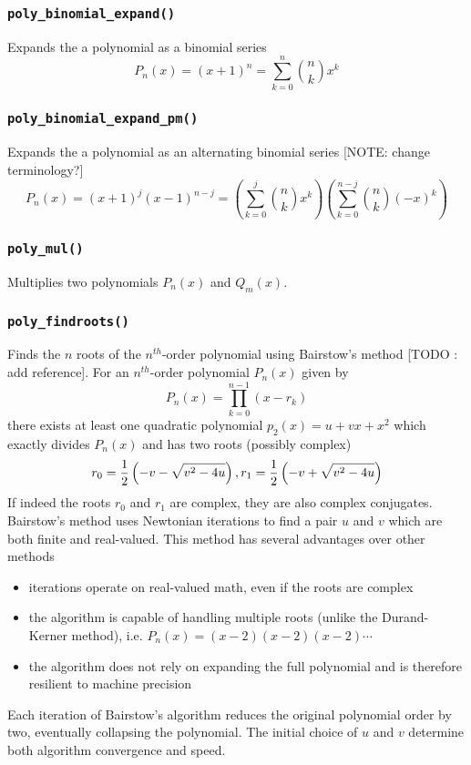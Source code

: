 \subsubsection{{\tt poly\_binomial\_expand()}}
Expands the a polynomial as a binomial series
\[
    P_n(x) = (x+1)^n = \sum_{k=0}^{n}{ {n \choose k} x^k}
\]

\subsubsection{{\tt poly\_binomial\_expand\_pm()}}
Expands the a polynomial as an alternating binomial series
[NOTE: change terminology?]
\[
    P_n(x) = (x+1)^j (x-1)^{n-j}
           = \left( \sum_{k=0}^{j}  { {n \choose k}    x^k} \right)
             \left( \sum_{k=0}^{n-j}{ {n \choose k} (-x)^k} \right)
\]

\subsubsection{{\tt poly\_mul()}}
Multiplies two polynomials $P_n(x)$ and $Q_m(x)$.


\subsubsection{{\tt poly\_findroots()}}
Finds the $n$ roots of the $n^{th}$-order polynomial using Bairstow's method
[TODO : add reference].
For an $n^{th}$-order polynomial $P_n(x)$ given by
\[
    P_n(x) = \prod_{k=0}^{n-1}{(x-r_k)}
\]
there exists at least one quadratic polynomial $p_{2}(x)=u + vx + x^2$ which
exactly divides $P_{n}(x)$ and has two roots (possibly complex)
\[
    r_0 = \frac{1}{2}\left(-v-\sqrt{v^2-4u}\right), \; \\
    r_1 = \frac{1}{2}\left(-v+\sqrt{v^2-4u}\right)
\]
If indeed the roots $r_0$ and $r_1$ are complex, they are also complex
conjugates.
Bairstow's method uses Newtonian iterations to find a pair $u$ and $v$ which
are both finite and real-valued.
This method has several advantages over other methods
\begin{itemize}
\item iterations operate on real-valued math, even if the roots are complex
\item the algorithm is capable of handling multiple roots (unlike the
      Durand-Kerner method), i.e. $P_{n}(x) = (x-2)(x-2)(x-2)\cdots$
\item the algorithm does not rely on expanding the full polynomial and is
      therefore resilient to machine precision
\end{itemize}
Each iteration of Bairstow's algorithm reduces the original polynomial order
by two, eventually collapsing the polynomial.
The initial choice of $u$ and $v$ determine both algorithm convergence and
speed.

